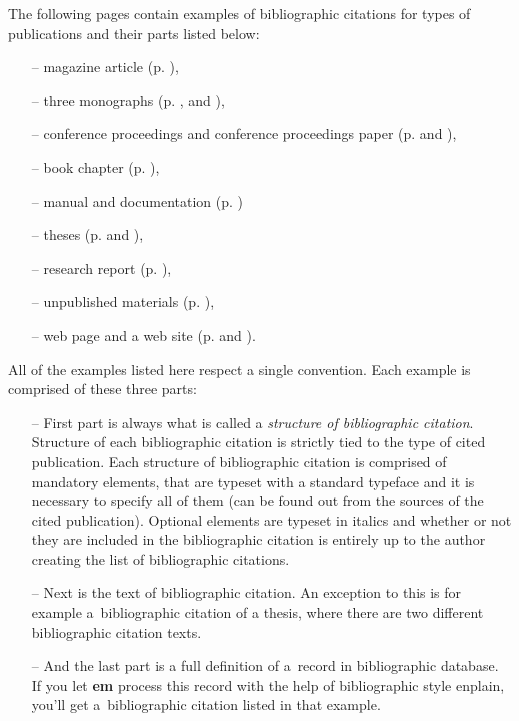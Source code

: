 The following pages contain examples of bibliographic citations for types of publications and their parts listed below:
\begin{itemize}
    \item[--] magazine article (p. \pageref{pr-casopis-clanek}),
    \item[--] three monographs (p. \pageref{pr-monografie1}, \pageref{pr-monografie2} and \pageref{pr-monografie3}),
    \item[--] conference proceedings and conference proceedings paper (p. \pageref{pr-sbornik} and \pageref{pr-sbornik-clanek}),
    \item[--] book chapter (p. \pageref{pr-kapitola-monografie}),
    \item[--] manual and documentation (p. \pageref{pr-manual-doc})
    \item[--] theses (p. \pageref{pr-akademicka-prace1} and \pageref{pr-akademicka-prace2}),
    \item[--] research report (p. \pageref{pr-vyzkum}),
    \item[--] unpublished materials (p. \pageref{pr-nepublikovane}),
    \item[--] web page and a web site (p. \pageref{pr-webpage} and \pageref{pr-website}).
\end{itemize}

All of the examples listed here respect a single convention. Each example is comprised of these three parts:
\begin{itemize}
    \item[--] First part is always what is called a \textit{structure of bibliographic citation}. Structure of each bibliographic citation is strictly tied to the type of cited publication. Each structure of bibliographic citation is comprised of mandatory elements, that are typeset with a standard typeface and it is necessary to specify all of them (can be found out from the sources of the cited publication). Optional elements are typeset in italics and whether or not they are included in the bibliographic citation is entirely up to the author creating the list of bibliographic citations.
    \item[--] Next is the text of bibliographic citation. An exception to this is for example a~bibliographic citation of a thesis, where there are two different bibliographic citation texts.
    \item[--] And the last part is a full definition of a~record in bibliographic database. If you let \textbf{em} process this record with the help of bibliographic style enplain, you'll get a~bibliographic citation listed in that example.
\end{itemize}

